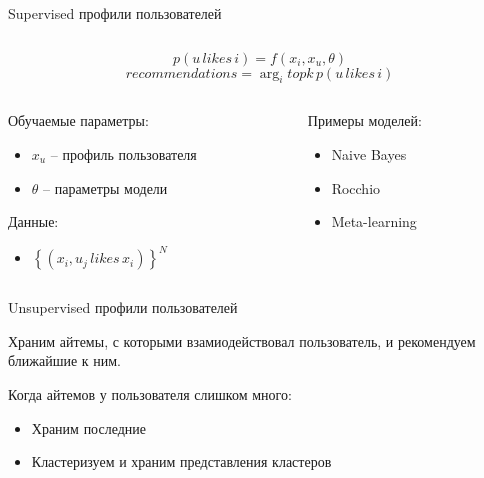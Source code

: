\documentclass[11pt,aspectratio=169,handout=true]{beamer}
\begin{document}
\begin{frame}{Supervised профили пользователей}

\begin{columns}
\begin{column}{0.15\textwidth} 
\end{column}
\begin{column}{0.6\textwidth} 
\begin{tcolorbox}[colback=info!5,colframe=info!80,title=Модель]
\[
p(u \, likes \, i) = f(x_i, x_u, \theta)
\]
\[
recommendations = \arg_i topk \, p(u \, likes \, i)
\]
\end{tcolorbox}
\end{column}
\begin{column}{0.15\textwidth} 
\end{column}
\end{columns}

\vfill

\begin{columns}
\begin{column}{0.45\textwidth}   
   Обучаемые параметры:
  \begin{itemize}
    \item $x_u$ -- профиль пользователя
    \item $\theta$ -- параметры модели
  \end{itemize}
  
  Данные:
  \begin{itemize}
    \item $\left\{ (x_i, u_j \, likes \, x_i) \right\}^N$
  \end{itemize}

\end{column}

\begin{column}{0.45\textwidth}
  Примеры моделей:
  \begin{itemize}
  \item Naive Bayes
  \item Rocchio
  \item Meta-learning
  \end{itemize}
    
\end{column}
\end{columns}

\end{frame}

\begin{frame}{Unsupervised профили пользователей}

\begin{tcolorbox}[colback=info!5,colframe=info!80,title=Идея]
Храним айтемы, с которыми взамиодействовал пользователь, и рекомендуем ближайшие к ним.
\end{tcolorbox}

\vfill

Когда айтемов у пользователя слишком много:
\begin{itemize}
\item Храним последние
\item Кластеризуем и храним представления кластеров \cite{PINNERSAGE}
\end{itemize} 

\end{frame}
\end{document}
